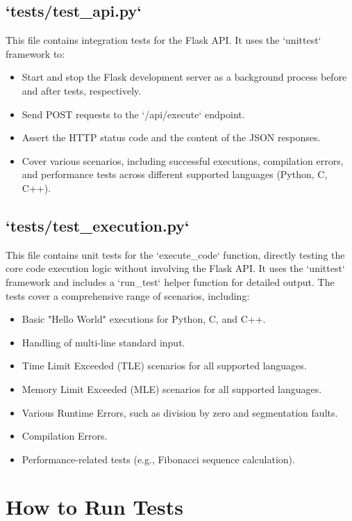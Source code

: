 \documentclass{article}
\begin{document}
\subsection*{`tests/test_api.py`}
This file contains integration tests for the Flask API. It uses the `unittest` framework to:
\begin{itemize}
    \item Start and stop the Flask development server as a background process before and after tests, respectively.
    \item Send POST requests to the `/api/execute` endpoint.
    \item Assert the HTTP status code and the content of the JSON responses.
    \item Cover various scenarios, including successful executions, compilation errors, and performance tests across different supported languages (Python, C, C++).
\end{itemize}

\subsection*{`tests/test_execution.py`}
This file contains unit tests for the `execute\_code` function, directly testing the core code execution logic without involving the Flask API. It uses the `unittest` framework and includes a `run\_test` helper function for detailed output. The tests cover a comprehensive range of scenarios, including:
\begin{itemize}
    \item Basic "Hello World" executions for Python, C, and C++.
    \item Handling of multi-line standard input.
    \item Time Limit Exceeded (TLE) scenarios for all supported languages.
    \item Memory Limit Exceeded (MLE) scenarios for all supported languages.
    \item Various Runtime Errors, such as division by zero and segmentation faults.
    \item Compilation Errors.
    \item Performance-related tests (e.g., Fibonacci sequence calculation).
\end{itemize}

\section*{How to Run Tests}
\end{document}

